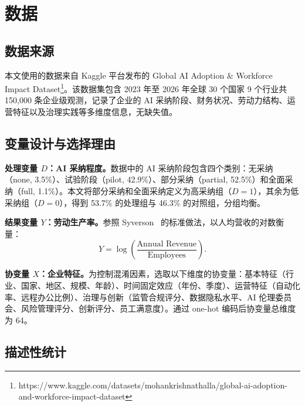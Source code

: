 \documentclass[UTF8,11pt,a4paper]{ctexart}
\begin{document}
\section{数据}\label{sec:data}

\subsection{数据来源}

本文使用的数据来自 Kaggle 平台发布的 Global AI Adoption \& Workforce Impact Dataset\footnote{https://www.kaggle.com/datasets/mohankrishnathalla/global-ai-adoption-and-workforce-impact-dataset}。该数据集包含 2023 年至 2026 年全球 30 个国家 9 个行业共 150{,}000 条企业级观测，记录了企业的 AI 采纳阶段、财务状况、劳动力结构、运营特征以及治理实践等多维度信息，无缺失值。

\subsection{变量设计与选择理由}

\textbf{处理变量 $D$：AI 采纳程度。}数据中的 AI 采纳阶段包含四个类别：无采纳（none, 3.5\%）、试验阶段（pilot, 42.9\%）、部分采纳（partial, 52.5\%）和全面采纳（full, 1.1\%）。本文将部分采纳和全面采纳定义为高采纳组（$D = 1$），其余为低采纳组（$D = 0$），得到 53.7\% 的处理组与 46.3\% 的对照组，分组均衡。

\textbf{结果变量 $Y$：劳动生产率。}参照 Syverson~\cite{syverson2011determinants} 的标准做法，以人均营收的对数衡量：
\begin{equation*}
Y = \log\!\left(\frac{\text{Annual Revenue}}{\text{Employees}}\right).
\end{equation*}

\textbf{协变量 $X$：企业特征。}为控制混淆因素，选取以下维度的协变量：基本特征（行业、国家、地区、规模、年龄）、时间固定效应（年份、季度）、运营特征（自动化率、远程办公比例）、治理与创新（监管合规评分、数据隐私水平、AI 伦理委员会、风险管理评分、创新评分、员工满意度）。通过 one-hot 编码后协变量总维度为 64。

\subsection{描述性统计}
\end{document}
